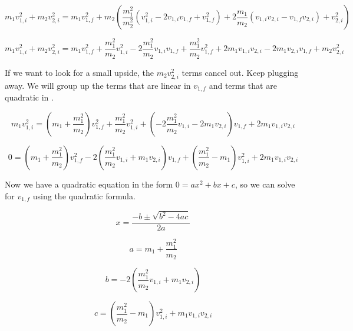 \documentclass[12pt]{book}
\begin{document}
\begin{exampleblock}
\begin{equation}
m_1 v_{1,i}^2 + m_2 v_{2,i}^2 = m_1 v_{1,f}^2 + m_2 \left( \frac{m_1^2}{m_2^2}(v_{1,i}^2 - 2 v_{1,i} v_{1,f} + v_{1,f}^2) + 2 \frac{m_1}{m_2} (v_{1,i} v_{2,i} - v_{1,f} v_{2,i}) + v_{2,i}^2 \right)
\end{equation}

\begin{equation}
m_1 v_{1,i}^2 + m_2 v_{2,i}^2 = m_1 v_{1,f}^2 + \frac{m_1^2}{m_2} v_{1,i}^2 - 2 \frac{m_1^2}{m_2} v_{1,i} v_{1,f} + \frac{m_1^2}{m_2} v_{1,f}^2 + 2 m_1 v_{1,i} v_{2,i} - 2 m_1 v_{2,i} v_{1,f} + m_2 v_{2,i}^2
\end{equation}

If we want to look for a small upside, the $m_2 v_{2,i}^2$ terms cancel out. Keep plugging away. We will group up the terms that are linear in $v_{1,f}$ and terms that are quadratic in .

\begin{equation}
m_1 v_{1,i}^2 = \left( m_1 + \frac{m_1^2}{m_2} \right) v_{1,f}^2 + \frac{m_1^2}{m_2} v_{1,i}^2 + \left( -2 \frac{m_1^2}{m_2} v_{1,i} - 2 m_1 v_{2,i} \right) v_{1,f} + 2 m_1 v_{1,i} v_{2,i}
\end{equation}

\begin{equation}
0 = \left( m_1 + \frac{m_1^2}{m_2} \right) v_{1,f}^2 - 2 \left( \frac{m_1^2}{m_2} v_{1,i} + m_1 v_{2,i} \right) v_{1,f} + \left( \frac{m_1^2}{m_2} - m_1 \right) v_{1,i}^2 + 2 m_1 v_{1,i} v_{2,i}
\end{equation}

Now we have a quadratic equation in the form $0 = ax^2 + bx + c$, so we can solve for $v_{1,f}$ using the quadratic formula.

\begin{equation}
x = \frac{-b \pm \sqrt{b^2 - 4ac}}{2a}
\end{equation}

\begin{equation}
a = m_1 + \frac{m_1^2}{m_2} 
\end{equation}

\begin{equation}
b = -2 \left( \frac{m_1^2}{m_2} v_{1,i} + m_1 v_{2,i} \right)
\end{equation}

\begin{equation}
c = \left( \frac{m_1^2}{m_2} - m_1 \right) v_{1,i}^2 + m_1 v_{1,i} v_{2,i}
\end{equation}


\end{exampleblock}
\end{document}
